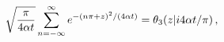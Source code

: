 \[\sqrt{\frac{\pi}{4\alpha t}}\sum\limits_{n=-\infty}^{\infty}e^{-(n\pi+z)^{2}/(%
4\alpha t)}=\mathop{\theta_{3}\/}\nolimits\!\left(z\middle|i4\alpha t/\pi%
\right),\]